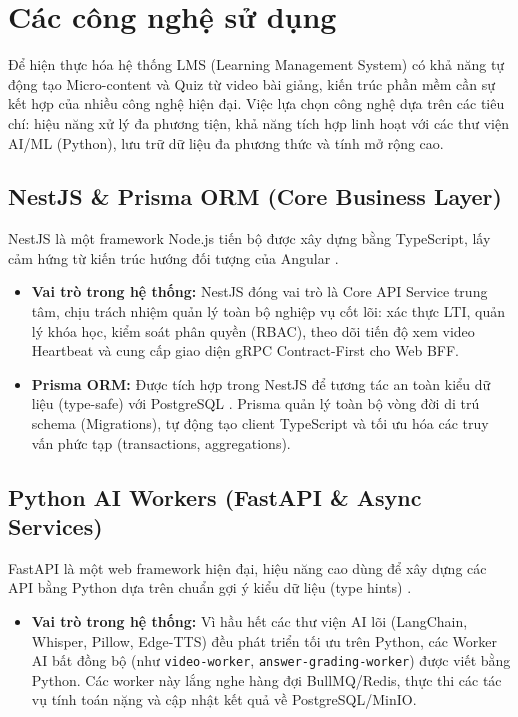 \section{Các công nghệ sử dụng}
Để hiện thực hóa hệ thống LMS (Learning Management System) có khả năng tự động tạo Micro-content và Quiz từ video bài giảng, kiến trúc phần mềm cần sự kết hợp của nhiều công nghệ hiện đại. Việc lựa chọn công nghệ dựa trên các tiêu chí: hiệu năng xử lý đa phương tiện, khả năng tích hợp linh hoạt với các thư viện AI/ML (Python), lưu trữ dữ liệu đa phương thức và tính mở rộng cao.

\subsection{NestJS \& Prisma ORM (Core Business Layer)}
NestJS là một framework Node.js tiến bộ được xây dựng bằng TypeScript, lấy cảm hứng từ kiến trúc hướng đối tượng của Angular \cite{nestjs2024}.
\begin{itemize}
    \item \textbf{Vai trò trong hệ thống:} NestJS đóng vai trò là Core API Service trung tâm, chịu trách nhiệm quản lý toàn bộ nghiệp vụ cốt lõi: xác thực LTI, quản lý khóa học, kiểm soát phân quyền (RBAC), theo dõi tiến độ xem video Heartbeat và cung cấp giao diện gRPC Contract-First cho Web BFF.
    \item \textbf{Prisma ORM:} Được tích hợp trong NestJS để tương tác an toàn kiểu dữ liệu (type-safe) với PostgreSQL \cite{prisma2024}. Prisma quản lý toàn bộ vòng đời di trú schema (Migrations), tự động tạo client TypeScript và tối ưu hóa các truy vấn phức tạp (transactions, aggregations).
\end{itemize}

\subsection{Python AI Workers (FastAPI \& Async Services)}
FastAPI là một web framework hiện đại, hiệu năng cao dùng để xây dựng các API bằng Python dựa trên chuẩn gợi ý kiểu dữ liệu (type hints) \cite{ramirez2018fastapi}.
\begin{itemize}
    \item \textbf{Vai trò trong hệ thống:} Vì hầu hết các thư viện AI lõi (LangChain, Whisper, Pillow, Edge-TTS) đều phát triển tối ưu trên Python, các Worker AI bất đồng bộ (như \texttt{video-worker}, \texttt{answer-grading-worker}) được viết bằng Python. Các worker này lắng nghe hàng đợi BullMQ/Redis, thực thi các tác vụ tính toán nặng và cập nhật kết quả về PostgreSQL/MinIO.
\end{itemize}

